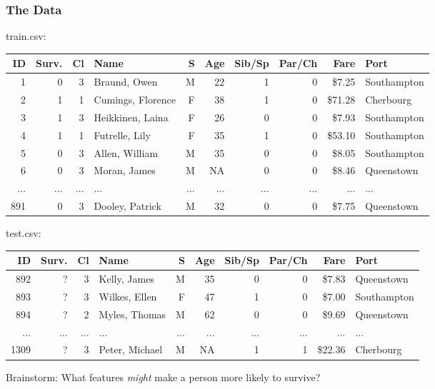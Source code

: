 \documentclass{beamer}
\begin{document}
\begin{frame}
\frametitle{The Data}
{\small train.csv:}
\begin{center}
{\tiny
\begin{tabular}{|r|r|r|l|r|r|r|r|r|l|}\hline
ID	& Surv.	& Cl	& Name					& S	& Age	& Sib/Sp	& Par/Ch	& Fare	& Port		\\\hline
1	& 0		& 3	& Braund, Owen			& M	& 22		& 1		& 0		& \$7.25	& Southampton	\\\hline
2	& 1		& 1	& Cumings, Florence		& F	& 38		& 1		& 0		& \$71.28	& Cherbourg	\\\hline
3	& 1		& 3	& Heikkinen, Laina			& F	& 26		& 0		& 0		& \$7.93	& Southampton	\\\hline
4	& 1		& 1	& Futrelle, Lily				& F	& 35		& 1		& 0		& \$53.10	& Southampton	\\\hline
5	& 0		& 3	& Allen, William			& M	& 35		& 0		& 0		& \$8.05	& Southampton	\\\hline
6	& 0		& 3	& Moran, James			& M	& NA		& 0		& 0		& \$8.46	& Queenstown	\\\hline
...	& ...		& ...	& ...						& ...	& ...		& ...		& ...		& ...		& ...			\\\hline
891	& 0		& 3	& Dooley, Patrick			& M	& 32		& 0		& 0		& \$7.75	& Queenstown	\\\hline
\end{tabular}
}
\end{center}
{\small test.csv:}
\begin{center}
{\tiny
\begin{tabular}{|r|r|r|l|r|r|r|r|r|l|}\hline
ID	& Surv.	& Cl	& Name					& S	& Age	& Sib/Sp	& Par/Ch	& Fare	& Port		\\\hline
892	& ?		& 3	& Kelly, James				& M	& 35		& 0		& 0		& \$7.83	& Queenstown	\\\hline
893	& ?		& 3	& Wilkes, Ellen				& F	& 47		& 1		& 0		& \$7.00	& Southampton	\\\hline
894	& ?		& 2	& Myles, Thomas\hspace{.25cm} & M& 62	& 0		& 0		& \$9.69	& Queenstown	\\\hline
...	& ...		& ...	& ...						& ...	& ...		& ...		& ...		& ...		& ...			\\\hline
1309	& ?		& 3	& Peter, Michael			& M	& NA		& 1		& 1		& \$22.36	& Cherbourg	\\\hline
\end{tabular}
}
\end{center}
\vspace{.5cm}
{\small Brainstorm: What features {\it might} make a person more likely to survive?}
\end{frame}
\end{document}
